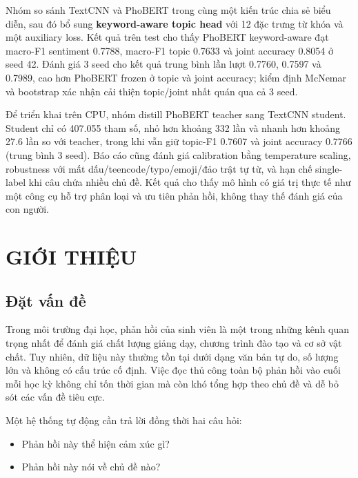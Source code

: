 \documentclass[12pt,a4paper]{report}
\begin{document}
Nhóm so sánh TextCNN và PhoBERT trong cùng một kiến trúc chia sẻ biểu diễn, sau đó bổ sung \textbf{keyword-aware topic head} với 12 đặc trưng từ khóa và một auxiliary loss. Kết quả trên test cho thấy PhoBERT keyword-aware đạt macro-F1 sentiment 0.7788, macro-F1 topic 0.7633 và joint accuracy 0.8054 ở seed 42. Đánh giá 3 seed cho kết quả trung bình lần lượt 0.7760, 0.7597 và 0.7989, cao hơn PhoBERT frozen ở topic và joint accuracy; kiểm định McNemar và bootstrap xác nhận cải thiện topic/joint nhất quán qua cả 3 seed.

Để triển khai trên CPU, nhóm distill PhoBERT teacher sang TextCNN student. Student chỉ có 407.055 tham số, nhỏ hơn khoảng 332 lần và nhanh hơn khoảng 27.6 lần so với teacher, trong khi vẫn giữ topic-F1 0.7607 và joint accuracy 0.7766 (trung bình 3 seed). Báo cáo cũng đánh giá calibration bằng temperature scaling, robustness với mất dấu/teencode/typo/emoji/đảo trật tự từ, và hạn chế single-label khi câu chứa nhiều chủ đề. Kết quả cho thấy mô hình có giá trị thực tế như một công cụ hỗ trợ phân loại và ưu tiên phản hồi, không thay thế đánh giá của con người.

\clearpage
\tableofcontents
\clearpage
\listoffigures
\clearpage
\listoftables

\clearpage
{}
\setcounter{page}{1}
\chapter{GIỚI THIỆU}

\section{Đặt vấn đề}

Trong môi trường đại học, phản hồi của sinh viên là một trong những kênh quan trọng nhất để đánh giá chất lượng giảng dạy, chương trình đào tạo và cơ sở vật chất. Tuy nhiên, dữ liệu này thường tồn tại dưới dạng văn bản tự do, số lượng lớn và không có cấu trúc cố định. Việc đọc thủ công toàn bộ phản hồi vào cuối mỗi học kỳ không chỉ tốn thời gian mà còn khó tổng hợp theo chủ đề và dễ bỏ sót các vấn đề tiêu cực.

Một hệ thống tự động cần trả lời đồng thời hai câu hỏi:

\begin{itemize}[leftmargin=1.2cm]
  \item Phản hồi này thể hiện cảm xúc gì?
  \item Phản hồi này nói về chủ đề nào?
\end{itemize}
\end{document}
